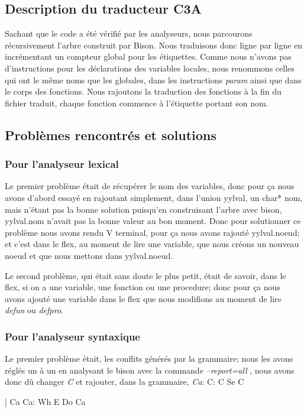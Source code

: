 \documentclass[10pt,a4paper]{article}
\begin{document}
\subsection{Description du traducteur C3A}
Sachant que le code a été vérifié par les analyseurs, nous parcourons récursivement l'arbre construit par Bison. Nous traduisons donc ligne par ligne en incrémentant un compteur global pour les étiquettes. Comme nous n'avons pas d'instructions pour les déclarations des variables locales, nous renommons celles qui ont le même noms que les globales, dans les instructions \textit{param} ainsi que dans le corps des fonctions. Nous rajoutons la traduction des fonctions à la fin du fichier traduit, chaque fonction commence à l'étiquette portant son nom.
\subsection{Problèmes rencontrés et solutions}
\subsubsection{Pour l'analyseur lexical}
Le premier problème était de récupérer le nom des variables, donc pour ça nous avons d'abord essayé en rajoutant simplement, dans l'union yylval, un char* nom, mais n'étant pas la bonne solution puisqu'en construisant l'arbre avec bison, yylval.nom n'avait pas la bonne valeur au bon moment. Donc pour solutionner ce problème nous avons rendu V terminal, pour ça nous avons rajouté yylval.noeud; et c'est dans le flex, au moment de lire une variable, que nous créons un nouveau noeud et que nous mettons dans yylval.noeud.

Le second problème, qui était sans doute le plus petit, était de savoir, dans le flex, si on a une variable, une fonction ou une procedure; donc pour ça nous avons ajouté une variable dans le flex que nous modifions au moment de lire \textit{defun} ou \textit{defpro}.

\subsubsection{Pour l'analyseur syntaxique}
Le premier problème était, les conflits générés par la grammaire; nous les avons réglés un à un en analysant le bison avec la commande \textit{--report=all} , nous avons donc dû changer \textit{C} et rajouter, dans la grammaire, \textit{Ca}:\newline 
C: C Se C
    
| Ca\newline\newline
Ca: Wh E Do Ca
\end{document}
